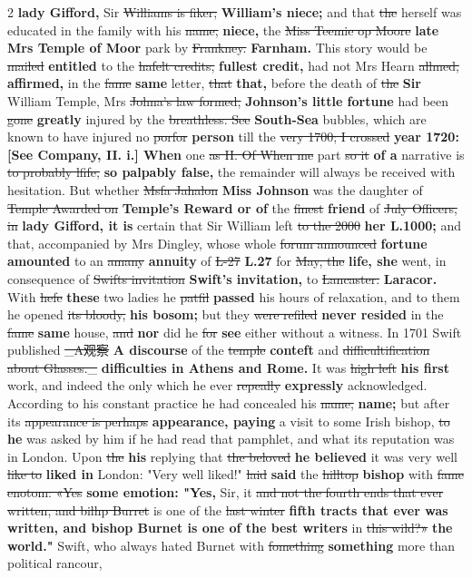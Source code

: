 \documentclass[10pt]{article}
\begin{document}
\begin{multicols}{2}
\textbf{lady Gifford,} Sir \sout{Williams is fiker;} \textbf{William's niece;} and that \sout{the} herself was educated in the family with his \sout{name,} \textbf{niece,} the \sout{Miss Teemie op Moore} \textbf{late Mrs Temple of Moor} park by \sout{Frankney.} \textbf{Farnham.} This story would be \sout{mailed} \textbf{entitled} to the \sout{hafelt credits,} \textbf{fullest credit,} had not Mrs Hearn \sout{allmed,} \textbf{affirmed,} in the \sout{fame} \textbf{same} letter, \sout{that} \textbf{that,} before the death of \sout{the} \textbf{Sir} William Temple, Mrs \sout{Johna’s law formed,} \textbf{Johnson's little fortune} had been \sout{gone} \textbf{greatly} injured by the \sout{breathless. See} \textbf{South-Sea} bubbles, which are known to have injured no \sout{porfor} \textbf{person} till the \sout{very 1700; I crossed} \textbf{year 1720: [See Company, II. i.] When} one \sout{as II. Of When me} part \sout{so it} \textbf{of a} narrative is \sout{to probably lfife,} \textbf{so palpably false,} the remainder will always be received with hesitation. But whether \sout{Msfa Jahalon} \textbf{Miss Johnson} was the daughter of \sout{Temple Awarded on} \textbf{Temple's Reward or of} the \sout{finest} \textbf{friend} of \sout{July Officers, in} \textbf{lady Gifford, it is} certain that Sir William left \sout{to the 2000} \textbf{her L.1000;} and that, accompanied by Mrs Dingley, whose whole \sout{forum announced} \textbf{fortune amounted} to an \sout{amany} \textbf{annuity} of \sout{L-27} \textbf{L.27} for \sout{May, the} \textbf{life, she} went, in consequence of \sout{Swifts invitation} \textbf{Swift's invitation,} to \sout{Lancaster.} \textbf{Laracor.} With \sout{hefe} \textbf{these} two ladies he \sout{patfil} \textbf{passed} his hours of relaxation, and to them he opened \sout{its bloody,} \textbf{his bosom;} but they \sout{were refiled} \textbf{never resided} in the \sout{fame} \textbf{same} house, \sout{and} \textbf{nor} did he \sout{for} \textbf{see} either without a witness. In 1701 Swift published \sout{\_A观察} \textbf{A discourse} of the \sout{temple} \textbf{conteft} and \sout{difficultification about Glasses.\_} \textbf{difficulties in Athens and Rome.} It was \sout{high left} \textbf{his first} work, and indeed the only which he ever \sout{repeally} \textbf{expressly} acknowledged. According to his constant practice he had concealed his \sout{name,} \textbf{name;} but after its \sout{appearance is perhaps} \textbf{appearance, paying} a visit to some Irish bishop, \sout{to} \textbf{he} was asked by him if he had read that pamphlet, and what its reputation was in London. Upon \sout{the} \textbf{his} replying that \sout{the beloved} \textbf{he believed} it was very well \sout{like to} \textbf{liked in} London: "Very well liked!" \sout{laid} \textbf{said} the \sout{hilltop} \textbf{bishop} with \sout{fame enotom: «Yes} \textbf{some emotion: "Yes,} Sir, it \sout{and not the fourth ends that ever written, and bilhp Burret} is one of the \sout{last winter} \textbf{fifth tracts that ever was written, and bishop Burnet is one of the best writers} in \sout{this wild?»} \textbf{the world."} Swift, who always hated Burnet with \sout{fomething} \textbf{something} more than political rancour, 
\end{multicols}
\end{document}
